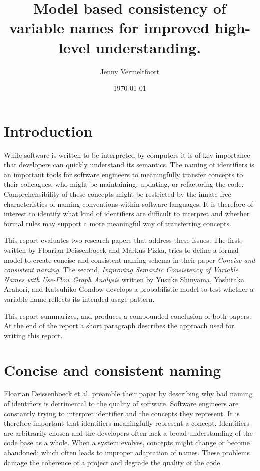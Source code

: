\documentclass[a4paper,12pt]{article}
\begin{document}
\title{Model based consistency of variable names for improved high-level understanding.}
\author{Jenny Vermeltfoort}
\date{\today}
\maketitle

\sectionfont{\centering\MakeUppercase}
\begin{multicols}{2}

\section*{Introduction}
While software is written to be interpreted by computers it is of key importance that developers can quickly understand its semantics. The naming of identifiers is an important tools for software engineers to meaningfully transfer concepts to their colleagues, who might be maintaining, updating, or refactoring the code. Comprehensibility of these concepts might be restricted by the innate free characteristics of naming conventions within software languages. It is therefore of interest to identify what kind of identifiers are difficult to interpret and whether formal rules may support a more meaningful way of transferring concepts.

This report evaluates two research papers that address these issues. The first, written by Floarian Deissenboeck and Markus Pizka, tries to define a formal model to create concise and consistent naming schema in their paper \textit{Concise and consistent naming}. The second, \textit{Improving Semantic Consistency of Variable Names with Use-Flow Graph Analysis} written by Yusuke Shinyama, Yoshitaka Arahori, and Katsuhiko Gondow develops a probabilistic model to test whether a variable name reflects its intended usage pattern. 

This report summarizes, and produces a compounded conclusion of both papers. At the end of the report a short paragraph describes the approach used for writing this report.

\newpage

\section*{Concise and consistent naming}
Floarian Deissenboeck et al. preamble their paper by describing why bad naming of identifiers is detrimental to the quality of software. Software engineers are constantly trying to interpret identifier and the concepts they represent. It is therefore important that identifiers meaningfully represent a concept. Identifiers are arbitrarily chosen and the developers often lack a broad understanding of the code base as a whole. When a system evolves, concepts might change or become abandoned; which often leads to improper adaptation of names. These problems damage the coherence of a project and degrade the quality of the code.


\end{multicols}
\end{document}

